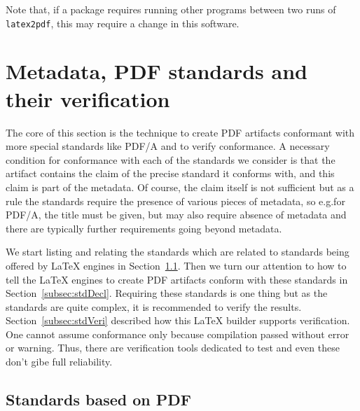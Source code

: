 Note that, if a package requires running other programs 
between two runs of \texttt{latex2pdf}, 
this may require a change in this software. 

\section{Metadata, PDF standards and their verification}\label{sec:stdVerify}

The core of this section is the technique to create PDF artifacts 
conformant with more special standards like PDF/A and to verify conformance. 
A necessary condition for conformance with each of the standards we consider 
is that the artifact contains the claim of the precise standard it conforms with, 
and this claim is part of the metadata. 
Of course, the claim itself is not sufficient but as a rule 
the standards require the presence of various pieces of metadata, 
so e.g.\@ for PDF/A, the title must be given, but may also require absence of metadata 
and there are typically further requirements going beyond metadata. 

We start listing and relating the standards 
which are related to standards being offered by \LaTeX{} engines 
in Section~\ref{subsec:stdPdf}. 
Then we turn our attention to how to tell the \LaTeX{} engines 
to create PDF artifacts 
conform with these standards in Section~\ref{subsec:stdDecl}. 
Requiring these standards is one thing but as the standards are quite complex, 
it is recommended to verify the results. 
Section~\ref{subsec:stdVeri} described how this \LaTeX{} builder supports verification. 
One cannot assume conformance only because compilation passed without error or warning. 
Thus, there are verification tools dedicated to test 
and even these don't gibe full reliability. 



\subsection{Standards based on PDF}\label{subsec:stdPdf}

